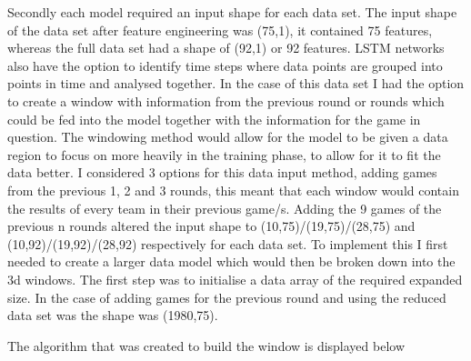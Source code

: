 \documentclass{imc-inf}
\begin{document}
	Secondly each model required an input shape for each data set. The input shape of the data set after feature engineering was (75,1), it contained 75 features, whereas the full data set had a shape of (92,1) or 92 features. LSTM networks also have the option to identify time steps where data points are grouped into points in time and analysed together. In the case of this data set I had the option to create a window with information from the previous round or rounds which could be fed into the model together with the information for the game in question. The windowing method would allow for the model to be given a data region to focus on more heavily in the training phase, to allow for it to fit the data better. I considered 3 options for this data input method, adding games from the previous 1, 2 and 3 rounds, this meant that each window would contain the results of every team in their previous game/s. Adding the 9 games of the previous n rounds altered the input shape to (10,75)/(19,75)/(28,75) and (10,92)/(19,92)/(28,92) respectively for each data set. To implement this I first needed to create a larger data model which would then be broken down into the 3d windows. The first step was to initialise a data array of the required expanded size. In the case of adding games for the previous round and using the reduced data set was the shape was (1980,75).

	The algorithm that was created to build the window is displayed below
\end{document}
